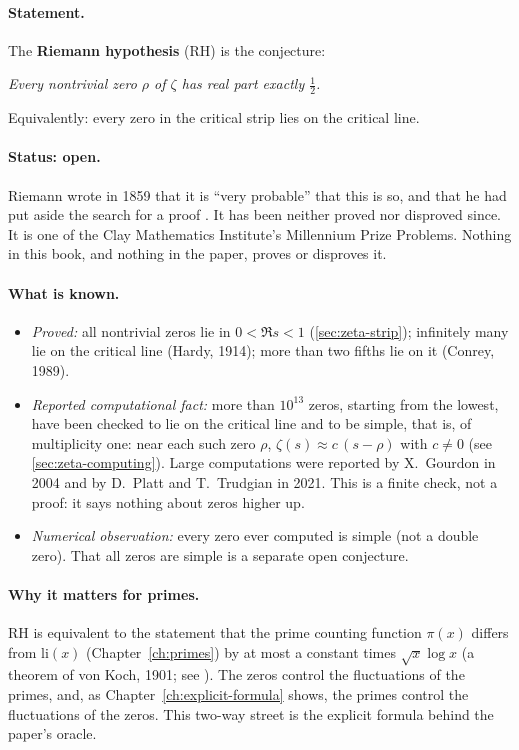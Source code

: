 \paragraph{Statement.} The \textbf{Riemann hypothesis} (RH) is the conjecture:
\begin{center}
\emph{Every nontrivial zero $\rho$ of $\zeta$ has real part exactly $\tfrac12$.}
\end{center}
Equivalently: every zero in the critical strip lies on the critical line.

\paragraph{Status: open.} Riemann wrote in 1859 that it is ``very probable'' that this is so, and that he had put aside the search for a proof \cite{riemann1859,edwards}. It has been neither proved nor disproved since. It is one of the Clay Mathematics Institute's Millennium Prize Problems. Nothing in this book, and nothing in the paper, proves or disproves it.

\paragraph{What is known.}
\begin{itemize}
\item \emph{Proved:} all nontrivial zeros lie in $0<\Re s<1$ (\cref{sec:zeta-strip}); infinitely many lie on the critical line (Hardy, 1914); more than two fifths lie on it (Conrey, 1989).
\item \emph{Reported computational fact:} more than $10^{13}$ zeros, starting from the lowest, have been checked to lie on the critical line and to be simple, that is, of multiplicity one: near each such zero $\rho$, $\zeta(s)\approx c\,(s-\rho)$ with $c\ne0$ (see \cref{sec:zeta-computing}). Large computations were reported by X.~Gourdon in 2004 and by D.~Platt and T.~Trudgian in 2021. This is a finite check, not a proof: it says nothing about zeros higher up.
\item \emph{Numerical observation:} every zero ever computed is simple (not a double zero). That all zeros are simple is a separate open conjecture.
\end{itemize}

\paragraph{Why it matters for primes.} RH is equivalent to the statement that the prime counting function $\pi(x)$ differs from $\mathrm{li}(x)$ (Chapter~\ref{ch:primes}) by at most a constant times $\sqrt{x}\log x$ (a theorem of von Koch, 1901; see \cite{davenport}). The zeros control the fluctuations of the primes, and, as Chapter~\ref{ch:explicit-formula} shows, the primes control the fluctuations of the zeros. This two-way street is the explicit formula behind the paper's oracle.

